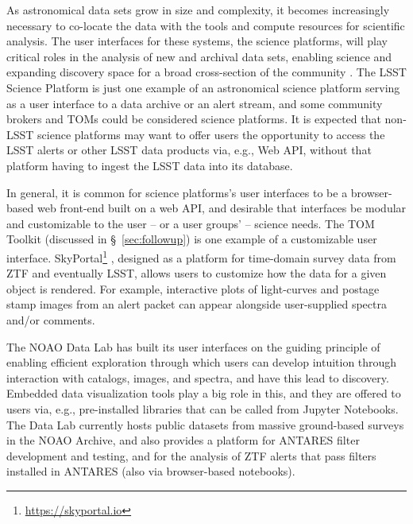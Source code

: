 As astronomical data sets grow in size and complexity, it becomes increasingly necessary to co-locate the data with the tools and compute resources for scientific analysis.
The user interfaces for these systems, the science platforms, will play critical roles in the analysis of new and archival data sets, enabling science and expanding discovery space for a broad cross-section of the community \citep[e.g.,][]{2019arXiv190305130O}.
The LSST Science Platform is just one example of an astronomical science platform serving as a user interface to a data archive or an alert stream, and some community brokers and TOMs could be considered science platforms.
It is expected that non-LSST science platforms may want to offer users the opportunity to access the LSST alerts or other LSST data products via, e.g., Web API, without that platform having to ingest the LSST data into its database.

In general, it is common for science platforms's user interfaces to be a browser-based web front-end built on a web API, and desirable that interfaces be modular and customizable to the user -- or a user groups' -- science needs.
The TOM Toolkit (discussed in \S~\ref{sec:followup}) is one example of a customizable user interface.
SkyPortal\footnote{\url{https://skyportal.io}} \citep{skyportal2019}, designed as a platform for time-domain survey data from ZTF and eventually LSST, allows users to customize how the data for a given object is rendered.
For example, interactive plots of light-curves and postage stamp images from an alert packet can appear alongside user-supplied spectra and/or comments.

The NOAO Data Lab \citep{2019arXiv190800664O} has built its user interfaces on the guiding principle of enabling efficient exploration through which users can develop intuition through interaction with catalogs, images, and spectra, and have this lead to discovery.
Embedded data visualization tools play a big role in this, and they are offered to users via, e.g., pre-installed libraries that can be called from Jupyter Notebooks.
The Data Lab currently hosts public datasets from massive ground-based surveys in the NOAO Archive, and also provides a platform for ANTARES filter development and testing, and for the analysis of ZTF alerts that pass filters installed in ANTARES (also via browser-based notebooks). 

